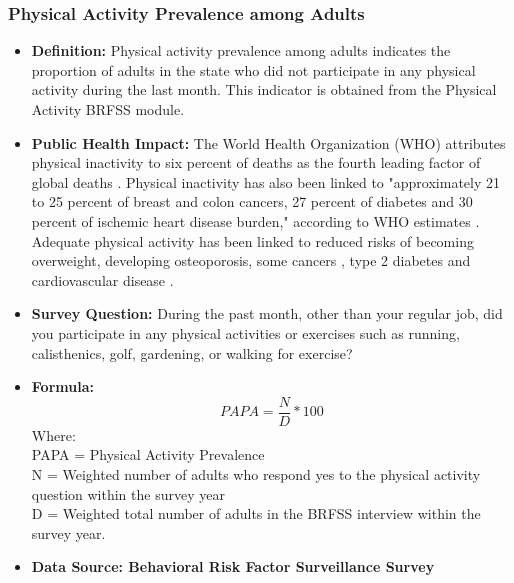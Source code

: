 \documentclass[12pt,letterpaper]{report}
\begin{document}
		\subsubsection{Physical Activity Prevalence among Adults} 
	\begin{itemize}
		\item \textbf{Definition:} Physical activity prevalence among adults indicates the proportion of adults in the state who did not participate in any physical activity during the last month. This indicator is obtained from the Physical Activity BRFSS module.
		\item \textbf{Public Health Impact:} The World Health Organization (WHO) attributes physical inactivity to six percent of deaths as the fourth leading factor of global deaths \cite{mathers2009global}. Physical inactivity has also been linked to "approximately 21 to 25 percent of breast and colon cancers, 27 percent of diabetes and 30 percent of ischemic heart disease burden," according to WHO estimates \cite{mathers2009global}. Adequate physical activity has been linked to reduced risks of becoming overweight, developing osteoporosis, some cancers \cite{kushi2006american}, type 2 diabetes and cardiovascular disease \cite{lifshitz2002reduction} \cite{bassuk2005epidemiological} \cite{healy2008objectively}.
		\item \textbf{Survey Question:} During the past month, other than your regular job, did you participate in any physical activities or exercises such as running, calisthenics, golf, gardening, or walking for exercise?
		\item \textbf{Formula:} 
			\begin{equation}
				PAPA = \frac{N}{D} *100
			\end{equation}
Where: \\
			PAPA = Physical Activity Prevalence \\
			
			N = Weighted number of adults who respond yes to the physical activity question within the survey year\\
			
			D = Weighted total number of adults in the BRFSS interview within the survey year.\\
			
		\item \textbf{Data Source: Behavioral Risk Factor Surveillance Survey}
	\end{itemize}

\end{document}
